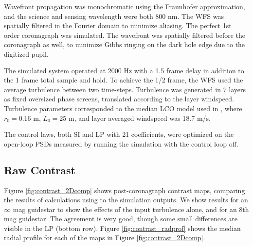 \documentclass[11pt,preprint]{aastex}
\begin{document}
Wavefront propagation was monochromatic using the Fraunhofer approximation, and the science and sensing wavelength were both 800 nm.  The WFS was spatially filtered in the Fourier domain to minimize aliasing.  The perfect 1st order coronagraph was simulated.  The wavefront was spatially filtered before the coronagraph as well, to minimize Gibbs ringing on the dark hole edge due to the digitized pupil.

The simulated system operated at 2000 Hz with a 1.5 frame delay in addition to the 1 frame total sample and hold.  To achieve the 1/2 frame, the WFS used the average turbulence between two time-steps.  Turbulence was generated in 7 layers as fixed oversized phase screens, translated according to the layer windspeed.   Turbulence parameters corresponded to the median LCO model used in \citet{2018JATIS...4a9001M}, where $r_0 = 0.16$ m, $L_0 = 25$ m, and layer averaged windspeed was 18.7 m/s.  

The control laws, both SI and LP with 21 coefficients, were optimized on the open-loop PSDs measured by running the simulation with the control loop off.

\subsection{Raw Contrast}
Figure \ref{fig:contrast_2Dcomp} shows post-coronagraph contrast maps, comparing the results of calculations using \citet{2018JATIS...4a9001M} to the simulation outputs.  We show results for an $\infty$ mag guidestar to show the effects of the input turbulence alone, and for an $8$th mag guidestar.  The agreement is very good, though some small differences are visible in the LP (bottom row). Figure \ref{fig:contrast_radprof} shows the median radial profile for each of the maps in Figure \ref{fig:contrast_2Dcomp}.  
\end{document}
